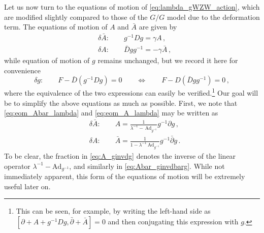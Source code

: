 \documentclass[11pt,a4paper]{article}
\numberwithin{equation}{section}
\numberwithin{table}{section}\setlength{\multlinegap}{25pt}
\begin{document}
Let us now turn to the equations of motion of \eqref{eq:lambda_gWZW_action}, which are modified slightly compared to those of the $G/G$ model due to the deformation term. The equations of motion of $A$ and $\bar{A}$ are given by
\begin{align}
	\label{eq:eom_Abar_lambda}
	&\delta \bar{A}:\qquad g^{-1}Dg = \gamma A\,,\\
	\label{eq:eom_A_lambda}
	&\delta A:\qquad \bar{D}g g^{-1} = -\gamma \bar{A}\,,
\end{align}
while equation of motion of $g$ remains unchanged, but we record it here for convenience
\begin{equation}
	\label{eq:eom_g_lambda}
	\delta g:\qquad F-\bar{D}(g^{-1}Dg)=0\qquad \iff \qquad  F-D(\bar{D}g g^{-1}) = 0\,,
\end{equation}
where the equivalence of the two expressions can easily be verified.\footnote{This can be seen, for example, by writing the left-hand side as $[\partial+A+g^{-1}Dg, \bar{\partial}+\bar{A} ]=0$ and then conjugating this expression with $g$.} Our goal will be to simplify the above equations as much as possible. First, we note that \eqref{eq:eom_Abar_lambda} and \eqref{eq:eom_A_lambda} may be written as
\begin{align}
\label{eq:A_ginvdg}	&\delta\bar{A}:\qquad A = \frac{1}{\lambda^{-1}-\,\mathrm{Ad}_{g^{-1}}} g^{-1}\partial g\,,\\
\label{eq:Abar_ginvdbarg}	&\delta A:\qquad \bar{A} = \frac{1}{1-\lambda^{-1}\,\mathrm{Ad}_{g^{-1}}} g^{-1}\bar{\partial}g\,.
\end{align}
To be clear, the fraction in \eqref{eq:A_ginvdg} denotes the inverse of the linear operator $\lambda^{-1}-\mathrm{Ad}_{g^{-1}}$, and similarly in \eqref{eq:Abar_ginvdbarg}. While not immediately apparent, this form of the equations of motion will be extremely useful later on. 
\end{document}
